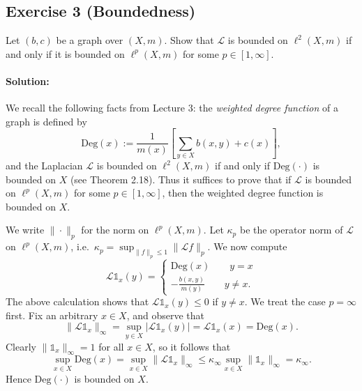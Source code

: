 \subsection{Exercise 3 (Boundedness)}
Let $(b,c)$ be a graph over $(X,m)$. Show that $\mathcal{L}$ is bounded on $\ell^2(X,m)$ if and only if it is bounded on $\ell^p(X,m)$ for some $p\in [1,\infty]$.

\paragraph{Solution:}

We recall the following facts from Lecture 3: the \emph{weighted degree function} of a graph is defined by
\begin{equation*}
	\mathrm{Deg}(x):= \frac{1}{m(x)}\left[\sum_{y\in X}b(x,y) +c(x) \right],
\end{equation*}
and the Laplacian $\mathcal{L}$ is bounded on $\ell^2(X,m)$ if and only if $\mathrm{Deg}(\cdot)$ is bounded on $X$ (see Theorem 2.18). Thus it suffices to prove that if $\mathcal{L}$ is bounded on $\ell^p(X,m)$ for some $p\in [1,\infty]$, then the weighted degree function is bounded on $X$.

We write $\|\cdot\|_p$ for the norm on $\ell^p(X,m)$. Let $\kappa_p$ be the operator norm of $\mathcal{L}$ on $\ell^p(X,m)$, i.e.\ $\kappa_p = \sup_{\|f\|_p \le 1}\|\mathcal{L}f\|_p$. We now compute
\begin{equation}
	\mathcal{L}\mathds{1}_x(y) = \begin{cases}
		\mathrm{Deg}(x) \qquad y=x \\ -\frac{b(x,y)}{m(y)} \qquad y\ne x.
		\end{cases}
\end{equation}
The above calculation shows that $\mathcal{L}\mathds{1}_x(y)\le 0$ if $y\ne x$. We treat the case $p=\infty$ first. Fix an arbitrary $x\in X$, and observe that
\begin{equation*}
	\|\mathcal{L}\mathds{1}_x\|_\infty = \sup_{y\in X}|\mathcal{L}\mathds{1}_x(y)| = \mathcal{L}\mathds{1}_x(x) = \mathrm{Deg}(x).
\end{equation*}
Clearly $\|\mathds{1}_x\|_\infty =1$ for all $x\in X$, so it follows that
\begin{equation*}
	\sup_{x\in X}\mathrm{Deg}(x) = \sup_{x\in X}\|\mathcal{L}\mathds{1}_x\|_\infty \le \kappa_\infty \sup_{x\in X}\|\mathds{1}_x\|_\infty = \kappa_\infty.
\end{equation*}
Hence $\mathrm{Deg}(\cdot)$ is bounded on $X$.


